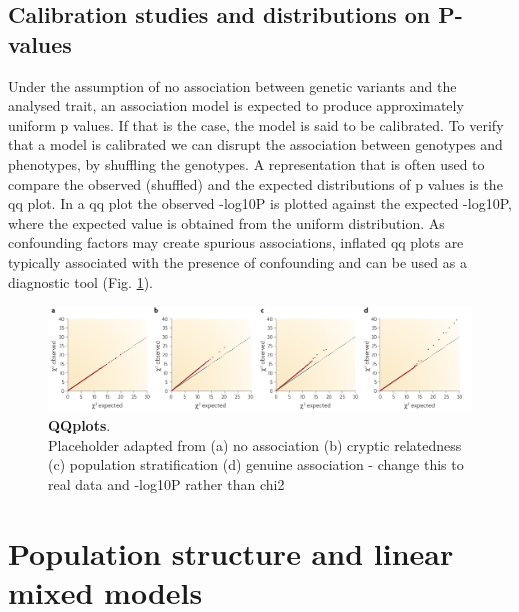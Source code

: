 \subsection{Calibration studies and distributions on P-values}

Under the assumption of no association between genetic variants and the analysed trait, an association model is expected to produce approximately uniform p values.
If that is the case, the model is said to be calibrated.
To verify that a model is calibrated we can disrupt the association between genotypes and phenotypes, by shuffling the genotypes. 
A representation that is often used to compare the observed (shuffled) and the expected distributions of p values is the \gls{qq} plot. 
In a \gls{qq} plot the observed -log10P is plotted against the expected -log10P, where the expected value is obtained from the uniform distribution. 
As confounding factors may create spurious associations, inflated \gls{qq} plots are typically associated with the presence of confounding and can be used as a diagnostic tool (Fig. \ref{fig:qqplots}). 

\begin{figure}[h]
\centering
\includegraphics[width=15cm]{Chapter2/Fig/qqplots.png}
\caption[\textbf{QQplots}]{\textbf{QQplots}.\\
Placeholder adapted from \cite{mccarthy2008genome}
(a) no association (b) cryptic relatedness (c) population stratification (d) genuine association - change this to real data and -log10P rather than chi2}
\label{fig:qqplots}
\end{figure}



\section{Population structure and linear mixed models}

